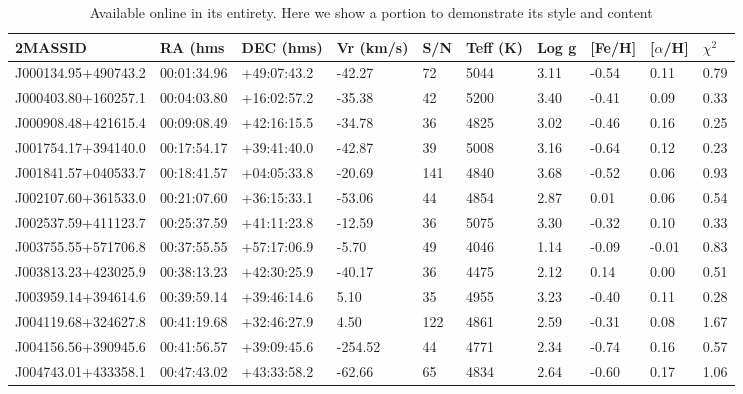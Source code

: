 \documentclass[a4paper,fleqn,usenatbib]{mnras}
\begin{document}
\begin{table}
\centering
\caption{Available online in its entirety. Here we show a portion to demonstrate its style and content}
\label{table:table1}
\begin{tabular}{@{}|l|l|l|l|l|l|l|l|l|l|@{}}
\toprule
2MASSID             & RA (hms         & DEC (hms)        & Vr (km/s) & S/N & Teff (K) & Log g & {[}Fe/H{]} & {[}$\alpha$/H{]} & $\chi^2$  \\ \midrule
J000134.95+490743.2 & 00:01:34.96 & +49:07:43.2 & -42.27    & 72  & 5044 & 3.11  & -0.54      & 0.11      & 0.79 \\ \midrule
J000403.80+160257.1 & 00:04:03.80 & +16:02:57.2 & -35.38    & 42  & 5200 & 3.40  & -0.41      & 0.09      & 0.33 \\ \midrule
J000908.48+421615.4 & 00:09:08.49 & +42:16:15.5 & -34.78    & 36  & 4825 & 3.02  & -0.46      & 0.16      & 0.25 \\ \midrule
J001754.17+394140.0 & 00:17:54.17 & +39:41:40.0 & -42.87    & 39  & 5008 & 3.16  & -0.64      & 0.12      & 0.23 \\ \midrule
J001841.57+040533.7 & 00:18:41.57 & +04:05:33.8 & -20.69    & 141 & 4840 & 3.68  & -0.52      & 0.06      & 0.93 \\ \midrule
J002107.60+361533.0 & 00:21:07.60 & +36:15:33.1 & -53.06    & 44  & 4854 & 2.87  & 0.01       & 0.06      & 0.54 \\ \midrule
J002537.59+411123.7 & 00:25:37.59 & +41:11:23.8 & -12.59    & 36  & 5075 & 3.30  & -0.32      & 0.10      & 0.33 \\ \midrule
J003755.55+571706.8 & 00:37:55.55 & +57:17:06.9 & -5.70     & 49  & 4046 & 1.14  & -0.09      & -0.01     & 0.83 \\ \midrule
J003813.23+423025.9 & 00:38:13.23 & +42:30:25.9 & -40.17    & 36  & 4475 & 2.12  & 0.14       & 0.00      & 0.51 \\ \midrule
J003959.14+394614.6 & 00:39:59.14 & +39:46:14.6 & 5.10      & 35  & 4955 & 3.23  & -0.40      & 0.11      & 0.28 \\ \midrule
J004119.68+324627.8 & 00:41:19.68 & +32:46:27.9 & 4.50      & 122 & 4861 & 2.59  & -0.31      & 0.08      & 1.67 \\ \midrule
J004156.56+390945.6 & 00:41:56.57 & +39:09:45.6 & -254.52   & 44  & 4771 & 2.34  & -0.74      & 0.16      & 0.57 \\ \midrule
J004743.01+433358.1 & 00:47:43.02 & +43:33:58.2 & -62.66    & 65  & 4834 & 2.64  & -0.60      & 0.17      & 1.06 \\ \midrule

\end{tabular}
\end{table}
\end{document}
